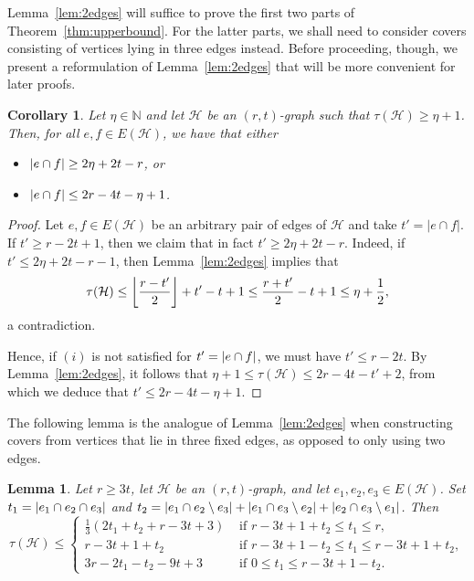 \documentclass[a4paper,twoside,11pt]{article}
\DeclarePairedDelimiter{\floor}{\lfloor}{\rfloor}
\DeclarePairedDelimiter{\card}{|}{|}
\newtheorem{lem}[thm]{Lemma}
\newtheorem{cor}[thm]{Corollary}
\numberwithin{thm}{section}
\theoremstyle{definition}
\theoremstyle{remark}
\theoremstyle{definition}
\def\cH{{\mathcal H}}
\newcommand{\m}[1]{\mathcal{#1}}
\begin{document}
Lemma~\ref{lem:2edges} will suffice to prove the first two parts of Theorem~\ref{thm:upperbound}.  For the latter parts, we shall need to consider covers consisting of vertices lying in three edges instead. Before proceeding, though, we present a reformulation of Lemma~\ref{lem:2edges} that will be more convenient for later proofs.

\begin{cor} \label{cor:2edgeagain}
Let $\eta\in \mathbb{N}$ and  let $\cH$ be an $(r,t)$-graph such that $\tau(\cH)\geq\eta+1$. Then, for all $e,f\in E(\cH)$, we have that either \begin{itemize}
    \item[$(i)$] $\card{e\cap f} \geq  2\eta +2t - r$, or
    \item[$(ii)$] $\card{e\cap f} \leq 2r-4t-\eta+1$.
\end{itemize}
\end{cor}
\begin{proof}
Let $e,f\in E(\cH)$ be an arbitrary pair of edges of $\cH$ and take $t'=|e\cap f|$. If $t'\geq r-2t+1$, then we claim that in fact $t'\geq 2 \eta +2t-r$. Indeed, if $t'\leq2\eta +2t-r-1$, then Lemma~\ref{lem:2edges} implies that \[\tau(\cH)\leq \floor*{\frac{r-t'}{2}}+t'-t+1\leq \frac{r + t'}{2}-t+1\leq\eta + \frac{1}{2}, \]
a contradiction. 

Hence, if $(i)$ is not satisfied for $t'=\card{e\cap f}$, we must have $t'\leq r-2t$.  By Lemma~\ref{lem:2edges}, it follows that $\eta + 1 \le \tau(\m H) \le 2r - 4t - t' + 2$, from which we deduce that $t' \le 2r - 4t - \eta + 1$.
\end{proof}

The following lemma is the analogue of Lemma~\ref{lem:2edges} when constructing covers from vertices that lie in three fixed edges, as opposed to only using two edges. 

\begin{lem} \label{lem:3edges}
Let $r \ge 3t$, let $\m H$ be an $(r,t)$-graph, and let $e_1,e_2,e_3 \in E(\m H)$.  Set $t_1 = \card{e_1\cap e_2\cap e_3}$ and $t_2 = \card{e_1\cap e_2 \setminus e_3}+\card{e_1\cap e_3 \setminus e_2}+ \card{e_2\cap e_3 \setminus e_1}$. Then
\[ \tau(\m H)\leq \begin{cases}
    \frac13 (2t_1+t_2+r-3t+3) & \text{ if } r-3t+1+t_2 \leq t_1\leq r, \\
    r-3t+1+t_2 & \text{ if }  r-3t+1-t_2\leq t_1\leq r-3t+1+t_2, \\
    3r-2t_1-t_2-9t+3 & \text{ if }  0\leq t_1\leq r-3t+1-t_2.
\end{cases} \]
\end{lem}
\end{document}
